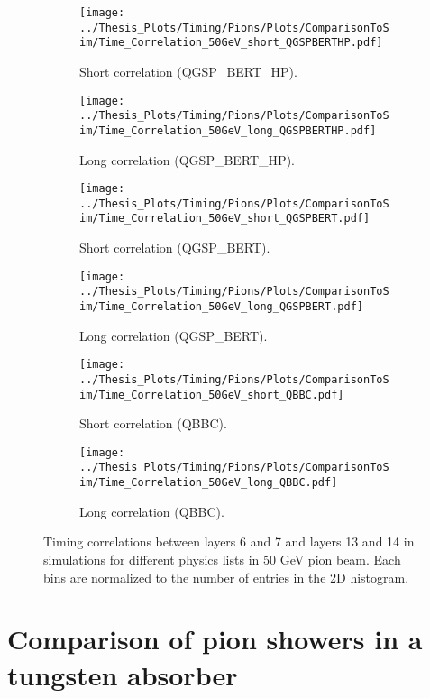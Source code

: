 \begin{figure}[htbp!]
	\begin{subfigure}[t]{0.5\textwidth}
		\centering
		\texttt{[image: ../Thesis\_Plots/Timing/Pions/Plots/ComparisonToSim/Time\_Correlation\_50GeV\_short\_QGSPBERTHP.pdf]}
		\caption{Short correlation (QGSP\_BERT\_HP).} \label{fig:Corr_short_QGSPBERTHP}
	\end{subfigure}
	\hfill
	\begin{subfigure}[t]{0.5\textwidth}
		\centering
		\texttt{[image: ../Thesis\_Plots/Timing/Pions/Plots/ComparisonToSim/Time\_Correlation\_50GeV\_long\_QGSPBERTHP.pdf]}
		\caption{Long correlation (QGSP\_BERT\_HP).} \label{fig:Corr_long_QGSPBERTHP}
	\end{subfigure}
	\hfill
	\begin{subfigure}[t]{0.5\textwidth}
		\centering
		\texttt{[image: ../Thesis\_Plots/Timing/Pions/Plots/ComparisonToSim/Time\_Correlation\_50GeV\_short\_QGSPBERT.pdf]}
		\caption{Short correlation (QGSP\_BERT).}\label{fig:Corr_short_QGSPBERT}
	\end{subfigure}
	\hfill
	\begin{subfigure}[t]{0.5\textwidth}
		\centering
		\texttt{[image: ../Thesis\_Plots/Timing/Pions/Plots/ComparisonToSim/Time\_Correlation\_50GeV\_long\_QGSPBERT.pdf]}
		\caption{Long correlation (QGSP\_BERT).} \label{fig:Corr_long_QGSPBERT}
	\end{subfigure}
	\hfill
	\begin{subfigure}[t]{0.5\textwidth}
		\centering
		\texttt{[image: ../Thesis\_Plots/Timing/Pions/Plots/ComparisonToSim/Time\_Correlation\_50GeV\_short\_QBBC.pdf]}
		\caption{Short correlation (QBBC).} \label{fig:Corr_short_QBBC}
	\end{subfigure}
	\hfill
	\begin{subfigure}[t]{0.5\textwidth}
		\centering
		\texttt{[image: ../Thesis\_Plots/Timing/Pions/Plots/ComparisonToSim/Time\_Correlation\_50GeV\_long\_QBBC.pdf]}
		\caption{Long correlation (QBBC).} \label{fig:Corr_long_QBBC}
	\end{subfigure}
	\caption{Timing correlations between layers 6 and 7 and layers 13 and 14 in \mokka simulations for different physics lists in 50 GeV pion beam. Each bins are normalized to the number of entries in the 2D histogram.}
	\label{fig:Corr_Mokka_Simulation}
\end{figure}

\section{Comparison of pion showers in a tungsten absorber}

